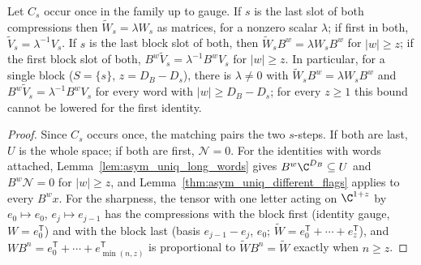 \begin{lemma}
    \label{cor:asym_uniq_one_block}
    \leanok
    Let $C_s$ occur once in the family up to gauge. If $s$ is the last slot of both compressions
    then $\widetilde W_s=\lambda W_s$ as matrices, for a nonzero scalar $\lambda$; if first in both,
    $\widetilde V_s=\lambda^{-1}V_s$. If $s$ is the last block slot of both, then
    $\widetilde W_sB^w=\lambda W_sB^w$ for $|w|\geq z$; if the first block slot of both,
    $B^w\widetilde V_s=\lambda^{-1}B^wV_s$ for $|w|\geq z$. In particular, for a single block
    ($S=\{s\}$, $z=D_B-D_s$), there is $\lambda\neq0$ with $\widetilde W_sB^w=\lambda W_sB^w$ and
    $B^w\widetilde V_s=\lambda^{-1}B^wV_s$ for every word with $|w|\geq D_B-D_s$; for every $z\geq1$
    this bound cannot be lowered for the first identity.
\end{lemma}

\begin{proof}
    \leanok
    Since $C_s$ occurs once, the matching pairs the two $s$-steps. If both are last, $U$ is the
    whole space; if both are first, $\mathcal N=0$. For the identities with words attached,
    Lemma~\ref{lem:asym_uniq_long_words} gives $B^w\C^{D_B}\subseteq U$ and $B^w\mathcal N=0$ for
    $|w|\geq z$, and Lemma~\ref{thm:asym_uniq_different_flags} applies to every $B^wx$. For the
    sharpness, the tensor with one letter acting on $\C^{1+z}$ by $e_0\mapsto e_0$, $e_j\mapsto e_{j-1}$
    has the compressions with the block first (identity gauge, $W=e_0^{\mathsf T}$) and with the
    block last (basis $e_{j-1}-e_j$, $e_0$; $\widetilde W=e_0^{\mathsf T}+\cdots+e_z^{\mathsf T}$), and
    $WB^n=e_0^{\mathsf T}+\cdots+e_{\min(n,z)}^{\mathsf T}$ is proportional to $\widetilde WB^n=\widetilde W$
    exactly when $n\geq z$.
\end{proof}

